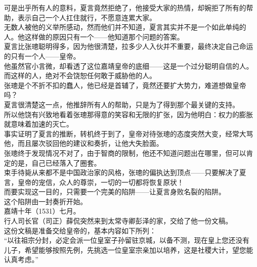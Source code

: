 \begin{multicols}{\theparacolNo}
可是出乎所有人的意料，夏言竟然拒绝了，他接受大家的热情，却婉拒了所有的帮助，表示自己一个人扛住就行，不愿意连累大家。\\

无数人被他的义举所感动，然而他们并不知道，夏言其实并不是一个如此单纯的人。他这样做的原因只有一个——他知道那个问题的答案。\\

夏言比张璁聪明得多，因为他很清楚，拉多少人入伙并不重要，最终决定自己命运的只有一个人——皇帝。\\

他虽然官小言微，却看透了这位嘉靖皇帝的底细——这是一个过分聪明自信的人。而这样的人，绝对不会饶恕任何敢于威胁他的人。\\

张璁是个不折不扣的蠢人，他已经是首辅了，竟然还要扩大势力，难道想做皇帝吗？\\

夏言很清楚这一点，他推辞所有人的帮助，只是为了得到那个最关键的支持。\\

所以他饶有兴致地看着张璁那得意的笑容和无限的扩张，因为他明白：权力的膨胀就意味着加速的灭亡。\\

事实证明了夏言的推断，转机终于到了，皇帝对待张璁的态度突然大变，经常大骂他，而且屡次驳回他的建议和奏折，让他大失脸面。\\

张璁终于发现情况不对了，由于智商的限制，他还不知道问题出在哪里，但可以肯定的是，自己已经落入了圈套。\\

束手待毙从来都不是中国政治家的风格，张璁的偏执达到顶点——只要解决了夏言，皇帝的宠信，众人的尊崇，一切的一切都将恢复原状！\\

而要实现这一目的，只需要一个完美的陷阱——让夏言身败名裂的陷阱。\\

这个陷阱由一封奏折开始。\\

嘉靖十年（1531）七月。\\

行人司长官（司正）薛侃突然来到太常寺卿彭泽的家，交给了他一份文稿。\\

这份文稿是准备交给皇帝的，基本内容如下所列：\\

“以往祖宗分封，必定会派一位皇室子孙留驻京城，以备不测，现在皇上您还没有儿子，希望能够按照先例，先挑选一位皇室宗亲加以培养，这是社稷大计，望您能认真考虑。”\\


\end{multicols}
